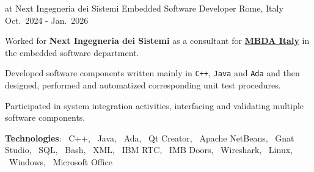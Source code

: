 \begin{cventries}
    \cventry
    {at Next Ingegneria dei Sistemi}
    {Embedded Software Developer}
    {Rome, Italy}
    {Oct.\ 2024 - Jan.\ 2026}
    {
        \begin{cvitems} %
            \item Worked for \textbf{Next Ingegneria dei Sistemi} as a consultant for \href{https://www.mbda-systems.com/country-it?rc=1}{\textbf{MBDA Italy}} in the embedded software department.
            \item Developed software components written mainly in \texttt{C++}, \texttt{Java} and \texttt{Ada} and then designed, performed and automatized corresponding unit test procedures.
            \item Participated in system integration activities, interfacing and validating multiple software components.
            \item[] \textbf{\textcolor{awesome}{Tec}hnologies}: \cpplogo{}~C++, \javalogo{}~Java, \adalogo{}~Ada, \qtlogo{}~Qt Creator, \netbeanslogo{}~Apache NetBeans, \gnatlogo{}~Gnat Studio, \SQLlogo{}~SQL, \bashlogo{}~Bash, \xmllogo{}~XML, \rtclogo{}~IBM RTC, \doorslogo{}~IMB Doors, \wiresharklogo{}~Wireshark, \linuxlogo{}~Linux, \windowslogo{}~Windows, \officelogo{}~Microsoft Office
        \end{cvitems}
    }

    

\end{cventries}
